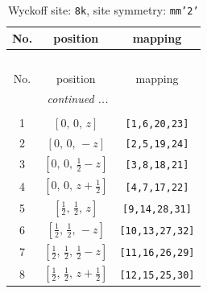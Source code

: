 \documentclass[fleqn,8pt]{jsarticle}
\begin{document}
\begin{longtable}{ccc}
\caption{Wyckoff site: {\tt 8k}, site symmetry: {\tt mm'2'}}
 \\
 \hline \hline
No. & position & mapping \\ \hline \endfirsthead

\multicolumn{2}{l}{\tablename\ \thetable{}} \\
 \hline \hline
No. & position & mapping \\ \hline \endhead

 \hline \hline
\multicolumn{2}{r}{\footnotesize\it continued ...} \\ \endfoot

 \hline \hline
\multicolumn{2}{r}{} \\ \endlastfoot

1 & $\left[ 0,\, 0,\, z \right]$ & {\tt [1,6,20,23]} \\ \hline
2 & $\left[ 0,\, 0,\, - z \right]$ & {\tt [2,5,19,24]} \\ \hline
3 & $\left[ 0,\, 0,\, \frac{1}{2} - z \right]$ & {\tt [3,8,18,21]} \\ \hline
4 & $\left[ 0,\, 0,\, z + \frac{1}{2} \right]$ & {\tt [4,7,17,22]} \\ \hline
5 & $\left[ \frac{1}{2},\, \frac{1}{2},\, z \right]$ & {\tt [9,14,28,31]} \\ \hline
6 & $\left[ \frac{1}{2},\, \frac{1}{2},\, - z \right]$ & {\tt [10,13,27,32]} \\ \hline
7 & $\left[ \frac{1}{2},\, \frac{1}{2},\, \frac{1}{2} - z \right]$ & {\tt [11,16,26,29]} \\ \hline
8 & $\left[ \frac{1}{2},\, \frac{1}{2},\, z + \frac{1}{2} \right]$ & {\tt [12,15,25,30]} \\
\end{longtable}
\renewcommand{\arraystretch}{1.2}
\end{document}
